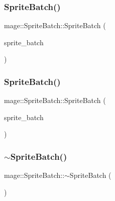 \hypertarget{classmage_1_1_sprite_batch_a10fe1d6cf1d2de9e087b370e7d696be8}{}\label{classmage_1_1_sprite_batch_a10fe1d6cf1d2de9e087b370e7d696be8} 
\subsubsection{\texorpdfstring{Sprite\+Batch()}{SpriteBatch()}\hspace{0.1cm}{\footnotesize\ttfamily [2/3]}}
{\footnotesize\ttfamily mage\+::\+Sprite\+Batch\+::\+Sprite\+Batch (\begin{DoxyParamCaption}\item[{const \hyperlink{classmage_1_1_sprite_batch}{Sprite\+Batch} \&}]{sprite\+\_\+batch }\end{DoxyParamCaption})\hspace{0.3cm}{\ttfamily [delete]}}

\hypertarget{classmage_1_1_sprite_batch_a135ff32d678465b7017eef3ab0430229}{}\label{classmage_1_1_sprite_batch_a135ff32d678465b7017eef3ab0430229} 
\subsubsection{\texorpdfstring{Sprite\+Batch()}{SpriteBatch()}\hspace{0.1cm}{\footnotesize\ttfamily [3/3]}}
{\footnotesize\ttfamily mage\+::\+Sprite\+Batch\+::\+Sprite\+Batch (\begin{DoxyParamCaption}\item[{\hyperlink{classmage_1_1_sprite_batch}{Sprite\+Batch} \&\&}]{sprite\+\_\+batch }\end{DoxyParamCaption})\hspace{0.3cm}{\ttfamily [default]}}

\hypertarget{classmage_1_1_sprite_batch_ae36a9c05e756fe45341746b19e2d08bc}{}\label{classmage_1_1_sprite_batch_ae36a9c05e756fe45341746b19e2d08bc} 
\subsubsection{\texorpdfstring{$\sim$\+Sprite\+Batch()}{~SpriteBatch()}}
{\footnotesize\ttfamily mage\+::\+Sprite\+Batch\+::$\sim$\+Sprite\+Batch (\begin{DoxyParamCaption}{ }\end{DoxyParamCaption})\hspace{0.3cm}{\ttfamily [default]}}



